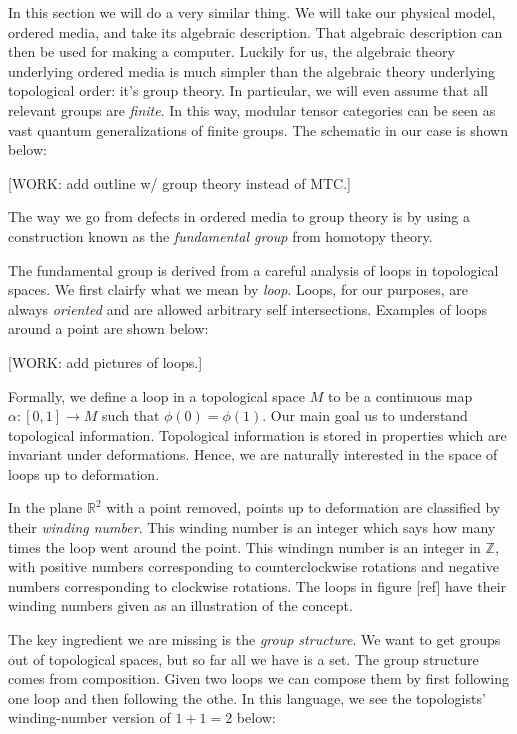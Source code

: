 \documentclass{article}
\theoremstyle{definition}
\newcommand{\RR}{\mathbb{R}}
\newcommand{\ZZ}{\mathbb{Z}}
\newcommand{\0}{\left|0\right>}
\newcommand{\1}{\left|1\right>}
\numberwithin{figure}{section}
\begin{document}
In this section we will do a very similar thing. We will take our physical model, ordered media, and take its algebraic description. That algebraic description can then be used for making a computer. Luckily for us, the algebraic theory underlying ordered media is much simpler than the algebraic theory underlying topological order: it's group theory. In particular, we will even assume that all relevant groups are \textit{finite}. In this way, modular tensor categories can be seen as vast quantum generalizations of finite groups. The schematic in our case is shown below:

[WORK: add outline w/ group theory instead of MTC.]

The way we go from defects in ordered media to group theory is by using a construction known as the \textit{fundamental group} from homotopy theory.

The fundamental group is derived from a careful analysis of loops in topological spaces. We first clairfy what we mean by \textit{loop}. Loops, for our purposes, are always \textit{oriented} and are allowed arbitrary self intersections. Examples of loops around a point are shown below:

[WORK: add pictures of loops.]

Formally, we define a loop in a topological space $M$ to be a continuous map $\alpha:[0,1]\to M$ such that $\phi(0)=\phi(1)$. Our main goal us to understand topological information. Topological information is stored in properties which are invariant under deformations. Hence, we are naturally interested in the space of loops up to deformation.

In the plane $\RR^2$ with a point removed, points up to deformation are classified by their \textit{winding number}. This winding number is an integer which says how many times the loop went around the point. This windingn number is an integer in $\ZZ$, with positive numbers corresponding to counterclockwise rotations and negative numbers corresponding to clockwise rotations. The loops in figure [ref] have their winding numbers given as an illustration of the concept.

The key ingredient we are missing is the \textit{group structure}. We want to get groups out of topological spaces, but so far all we have is a set. The group structure comes from composition. Given two loops we can compose them by first following one loop and then following the othe. In this language, we see the topologists' winding-number version of $1+1=2$ below:
\end{document}
